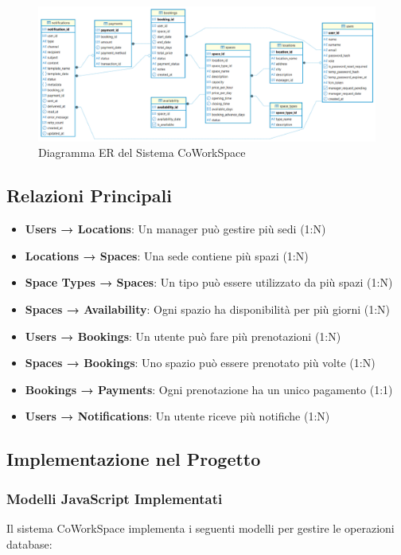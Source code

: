 \begin{figure}[H]
\centering
\includegraphics[width=\textwidth]{sections/ER_schema.png}
\caption{Diagramma ER del Sistema CoWorkSpace}
\label{fig:er_diagram}
\end{figure}

\subsection{Relazioni Principali}
\begin{itemize}
    \item \textbf{Users → Locations}: Un manager può gestire più sedi (1:N)
    \item \textbf{Locations → Spaces}: Una sede contiene più spazi (1:N)
    \item \textbf{Space Types → Spaces}: Un tipo può essere utilizzato da più spazi (1:N)
    \item \textbf{Spaces → Availability}: Ogni spazio ha disponibilità per più giorni (1:N)
    \item \textbf{Users → Bookings}: Un utente può fare più prenotazioni (1:N)
    \item \textbf{Spaces → Bookings}: Uno spazio può essere prenotato più volte (1:N)
    \item \textbf{Bookings → Payments}: Ogni prenotazione ha un unico pagamento (1:1)
    \item \textbf{Users → Notifications}: Un utente riceve più notifiche (1:N)
\end{itemize}

\subsection{Implementazione nel Progetto}

\subsubsection{Modelli JavaScript Implementati}
Il sistema CoWorkSpace implementa i seguenti modelli per gestire le operazioni database:

